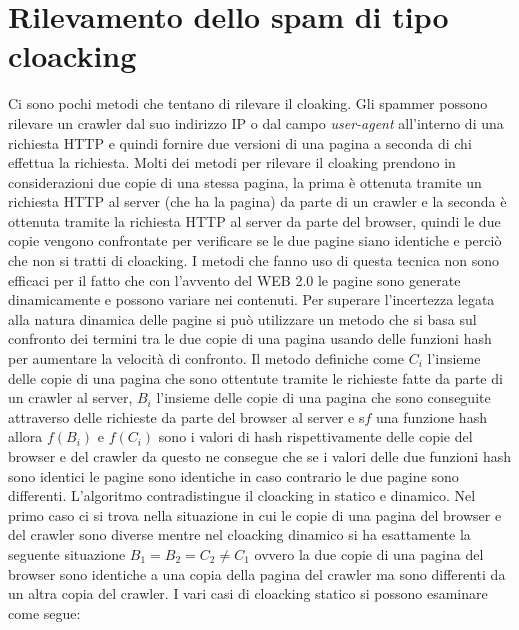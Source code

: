 \section{Rilevamento dello spam di tipo cloacking}
Ci sono pochi metodi che tentano di rilevare il cloaking. Gli spammer possono rilevare un crawler dal suo indirizzo IP o dal campo \textit{user-agent} all'interno di una richiesta HTTP e quindi fornire due versioni di una pagina a seconda di chi effettua la richiesta. Molti dei metodi per rilevare il cloaking prendono in considerazioni due copie di una stessa pagina, la prima è ottenuta tramite un richiesta HTTP al server (che ha la pagina) da parte di un crawler e la seconda è ottenuta tramite la richiesta HTTP al server da parte del browser, quindi le due copie vengono confrontate per verificare se le due pagine siano identiche e perciò che non si tratti di cloacking. I metodi che fanno uso di questa tecnica non sono efficaci per il fatto che con l'avvento del WEB 2.0 le pagine sono generate dinamicamente e possono variare nei contenuti. Per superare l'incertezza legata alla natura dinamica delle pagine si può utilizzare un metodo \cite{Ghiam:2013cloaking} che si basa sul confronto dei termini tra le due 
copie di una pagina usando delle funzioni hash per aumentare la velocità di confronto. Il metodo definiche come  \(C_i\) l'insieme delle copie di una pagina che sono ottentute tramite le richieste fatte da parte di un crawler al server, \(B_i\) l'insieme delle copie di una pagina che sono conseguite attraverso delle richieste da parte del browser al server e s\(f\) una funzione hash allora \(f(B_i)\) e \(f(C_i)\) sono i valori di hash rispettivamente delle copie del browser e del crawler da questo ne consegue che se i valori delle due funzioni hash sono identici le pagine sono identiche in caso contrario le due pagine sono differenti. L'algoritmo contradistingue il cloacking in statico e dinamico. Nel primo caso ci si trova nella situazione in cui le copie di una pagina del browser e del crawler sono diverse mentre nel cloacking dinamico si ha esattamente la seguente situazione \(B_1=B_2=C_2 \not =C_1\) ovvero la due copie di una pagina del browser sono identiche a una copia della pagina del crawler ma sono 
differenti da un altra copia del crawler. I vari casi di cloacking statico si possono esaminare come segue:
